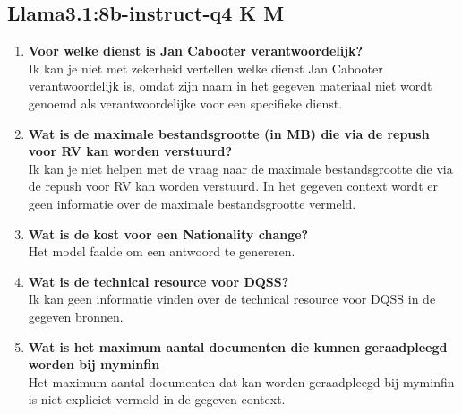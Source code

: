 \subsection{Llama3.1:8b-instruct-q4 K M}
\begin{enumerate}
    \item \textbf{Voor welke dienst is Jan Cabooter verantwoordelijk?}\\
    Ik kan je niet met zekerheid vertellen welke dienst Jan Cabooter verantwoordelijk is, omdat zijn naam in het gegeven materiaal niet wordt genoemd als verantwoordelijke voor een specifieke dienst.
    \item \textbf{Wat is de maximale bestandsgrootte (in MB) die via de repush voor RV kan worden verstuurd?}\\
    Ik kan je niet helpen met de vraag naar de maximale bestandsgrootte die via de repush voor RV kan worden verstuurd. In het gegeven context wordt er geen informatie over de maximale bestandsgrootte vermeld.
    \item \textbf{Wat is de kost voor een Nationality change?}\\
    Het model faalde om een antwoord te genereren.
    \item \textbf{Wat is de technical resource voor DQSS?}\\
    Ik kan geen informatie vinden over de technical resource voor DQSS in de gegeven bronnen.
    \item \textbf{Wat is het maximum aantal documenten die kunnen geraadpleegd worden bij myminfin}\\
    Het maximum aantal documenten dat kan worden geraadpleegd bij myminfin is niet expliciet vermeld in de gegeven context.
\end{enumerate}


